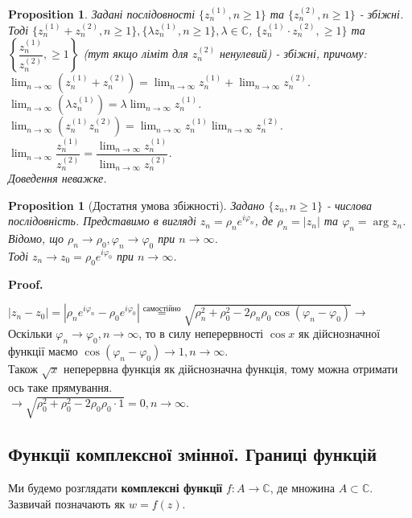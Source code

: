 \documentclass[a4paper, 10pt]{article}
\makeatletter
\def\qed{$\blacksquare$}
\theoremstyle{theoremdd}
\theoremstyle{theoremdd}
\theoremstyle{theoremdd}
\theoremstyle{theoremdd}
\theoremstyle{theoremdd}
\newtheorem{proposition}[theorem]{Proposition}
\theoremstyle{theoremdd}
\theoremstyle{theoremdd}
\theoremstyle{theoremdd}
\renewenvironment{proof}[1][Proof.\\]{\par
\pushQED{\hfill \qed}%
\normalfont \topsep6\p@\@plus6\p@\relax
\trivlist
\item\relax
{\bfseries
#1\@addpunct{.}}\hspace\labelsep\ignorespaces
}{%
\popQED\endtrivlist\@endpefalse
}
\makeatother
\begin{document}
\begin{proposition}
Задані послідовності $\{z_n^{(1)}, n \geq 1\}$ та $\{z_n^{(2)}, n \geq 1\}$ - збіжні. Тоді $\{z_n^{(1)}+z_n^{(2)}, n \geq 1\}, \{\lambda z_n^{(1)}, n \geq 1 \}, \lambda \in \mathbb{C}$, $\{z_n^{(1)} \cdot z_n^{(2)}, \geq 1\}$ та $\left\{ \dfrac{z_n^{(1)}}{z_n^{(2)}}, \geq 1 \right\}$ (тут якщо ліміт для $z_n^{(2)}$ ненулевий) - збіжні, причому:\\
$\displaystyle\lim_{n \to \infty} (z_n^{(1)} + z_n^{(2)}) = \lim_{n \to \infty} z_n^{(1)} + \lim_{n \to \infty} z_n^{(2)}$.\\
$\displaystyle\lim_{n \to \infty} (\lambda z_n^{(1)}) = \lambda \lim_{n \to \infty} z_n^{(1)}$.\\
$\displaystyle\lim_{n \to \infty} (z_n^{(1)} z_n^{(2)}) = \lim_{n \to \infty} z_n^{(1)} \lim_{n \to \infty} z_n^{(2)}$.\\
$\displaystyle\lim_{n \to \infty} \dfrac{z_n^{(1)}}{z_n^{(2)}} = \dfrac{\displaystyle\lim_{n \to \infty} z_n^{(1)}}{\displaystyle\lim_{n \to \infty} z_n^{(2)}}$.\\
\textit{Доведення неважке.}
\end{proposition}

\begin{proposition}[Достатня умова збіжності]
Задано $\{z_n, n \geq 1\}$ - числова послідовність. Представимо в вигляді $z_n = \rho_n e^{i \varphi_n}$, де $\rho_n = |z_n|$ та $\varphi_n = \arg z_n$. Відомо, що $\rho_n \to \rho_0, \varphi_n \to \varphi_0$ при $n \to \infty$.\\
Тоді $z_n \to z_0 = \rho_0 e^{i\varphi_0}$ при $n \to \infty$.
\end{proposition}

\begin{proof}
$|z_n - z_0| = |\rho_n e^{i\varphi_n} - \rho_0 e^{i \varphi_0}| \overset{\text{самостійно}}{=} \sqrt{\rho_n^2 + \rho_0^2 - 2 \rho_n \rho_0 \cos (\varphi_n-\varphi_0)} \boxed{\to}$\\
Оскільки $\varphi_n \to \varphi_0, n \to \infty$, то в силу неперервності $\cos x$ як дійснозначної функції маємо $\cos (\varphi_n - \varphi_0) \to 1, n \to \infty$.\\
Також $\sqrt{x}$ неперервна функція як дійснозначна функція, тому можна отримати ось таке прямування.\\
$\boxed{\to} \sqrt{\rho_0^2 + \rho_0^2 - 2 \rho_0 \rho_0 \cdot 1} = 0, n \to \infty$.
\end{proof}

\subsection{Функції комплексної змінної. Границі функцій}
Ми будемо розглядати \textbf{комплексні функції} $f: A \to \mathbb{C}$, де множина $A \subset \mathbb{C}$. Зазвичай позначають як $w = f(z)$.
\end{document}
